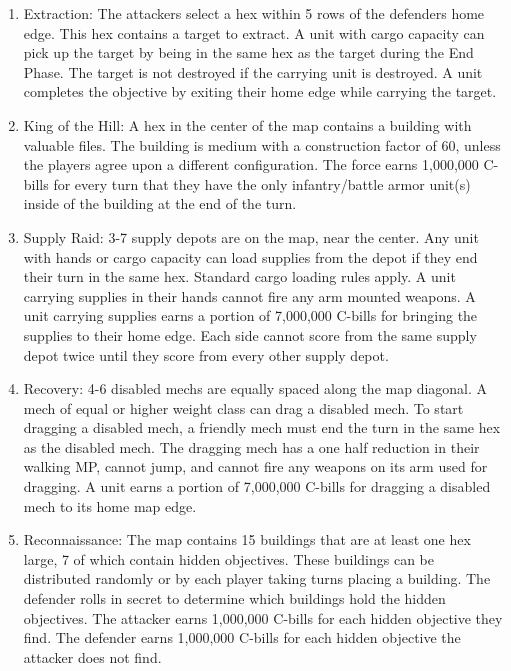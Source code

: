 \documentclass{article}
\begin{document}
\begin{enumerate}

\item Extraction: The attackers select a hex within 5 rows of the defenders home edge.
This hex contains a target to extract.
A unit with cargo capacity can pick up the target by being in the same hex as the target during the End Phase.
The target is not destroyed if the carrying unit is destroyed.
A unit completes the objective by exiting their home edge while carrying the target.

\item King of the Hill: A hex in the center of the map contains a building with valuable files.
The building is medium with a construction factor of 60, unless the players agree upon a different configuration.
The force earns 1,000,000 C-bills for every turn that they have the only infantry/battle armor unit(s) inside of the building at the end of the turn.

\item Supply Raid: 3-7 supply depots are on the map, near the center.
Any unit with hands or cargo capacity can load supplies from the depot if they end their turn in the same hex.
Standard cargo loading rules apply.
A unit carrying supplies in their hands cannot fire any arm mounted weapons.
A unit carrying supplies earns a portion of 7,000,000 C-bills for bringing the supplies to their home edge.
Each side cannot score from the same supply depot twice until they score from every other supply depot.

\item Recovery: 4-6 disabled mechs are equally spaced along the map diagonal.
A mech of equal or higher weight class can drag a disabled mech.
To start dragging a disabled mech, a friendly mech must end the turn in the same hex as the disabled mech.
The dragging mech has a one half reduction in their walking MP, cannot jump, and cannot fire any weapons on its arm used for dragging.
A unit earns a portion of 7,000,000 C-bills for dragging a disabled mech to its home map edge.

\item Reconnaissance: The map contains 15 buildings that are at least one hex large, 7 of which contain hidden objectives.
These buildings can be distributed randomly or by each player taking turns placing a building.
The defender rolls in secret to determine which buildings hold the hidden objectives.
The attacker earns 1,000,000 C-bills for each hidden objective they find.
The defender earns 1,000,000 C-bills for each hidden objective the attacker does not find.


\end{enumerate}
\end{document}
